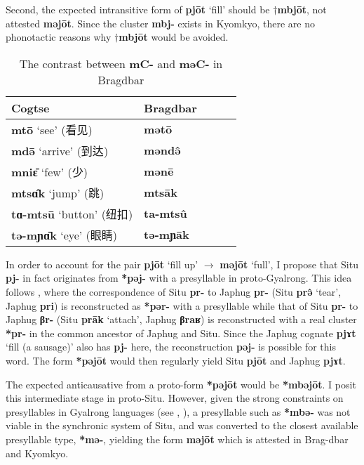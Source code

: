 \documentclass[oneside,a4paper,11pt]{article}
\newcommand{\ipa}[1]{\textbf{{\phon\mbox{#1}}}} %
\newcommand{\zh}[1]{{\cn #1}}
\begin{document}
Second, the expected intransitive form of \ipa{pjōt} `fill' should be $\dagger$\ipa{mbjōt}, not attested \ipa{məjōt}. Since the cluster \ipa{mbj-} exists in Kyomkyo, there are no phonotactic reasons why $\dagger$\ipa{mbjōt} would be avoided. 

\begin{table}[H]
\caption{The contrast between \ipa{mC-} and \ipa{məC-} in Bragdbar} \label{tab:mEC} \centering
\begin{tabular}{lllll}
\toprule
Cogtse & Bragdbar   \\
\midrule
\ipa{mtō} `see' (\zh{看见}) & \ipa{mətō}   \\
\ipa{mdə̄} `arrive' (\zh{到达}) & \ipa{məndə̂}    \\
\ipa{mniɛ̄} `few' (\zh{少}) & \ipa{mənē}    \\
\midrule
\ipa{mtsɑ̂k} `jump' (\zh{跳}) & \ipa{mtsāk}    \\
\ipa{tɑ-mtsū} `button' (\zh{纽扣}) & \ipa{ta-mtsû}    \\
\ipa{tə-mɲɑ̄k} `eye' (\zh{眼睛}) & \ipa{tə-mɲāk}    \\
\bottomrule
\end{tabular}
\end{table}

In order to account for the pair \ipa{pjōt} `fill up' $\rightarrow$ \ipa{məjōt} `full', I propose that Situ \ipa{pj-} in fact originates from \ipa{*pəj-} with a presyllable in proto-Gyalrong. This idea follows \citet[263;275;331]{jacques04these}, where the correspondence of Situ \ipa{pr-} to Japhug \ipa{pr-} (Situ \ipa{prə̂} `tear', Japhug \ipa{pri}) is reconstructed as \ipa{*pər-} with a presyllable while that of Situ \ipa{pr-} to Japhug \ipa{βr-} (Situ \ipa{prāk} `attach', Japhug \ipa{βraʁ}) is reconstructed with a real cluster \ipa{*pr-} in the common ancestor of Japhug and Situ. Since the Japhug cognate \ipa{pjɤt} `fill (a sausage)' also has \ipa{pj-} here, the reconstruction \ipa{pəj-} is possible for this word. The form \ipa{*pəjōt} would then regularly yield Situ  \ipa{pjōt} and Japhug  \ipa{pjɤt}.

The expected anticausative from a proto-form \ipa{*pəjōt} would be \ipa{*mbəjōt}. I posit this intermediate stage in proto-Situ. However, given the strong constraints on presyllables in Gyalrong languages (see \citealt[1220]{jacques12incorp},  \citealt[92]{jacques12agreement}), a presyllable such as \ipa{*mbə-} was not viable in the synchronic system of Situ, and was converted to the closest available presyllable type, \ipa{*mə-}, yielding the form \ipa{məjōt} which is attested in Brag-dbar and Kyomkyo.
\end{document}

